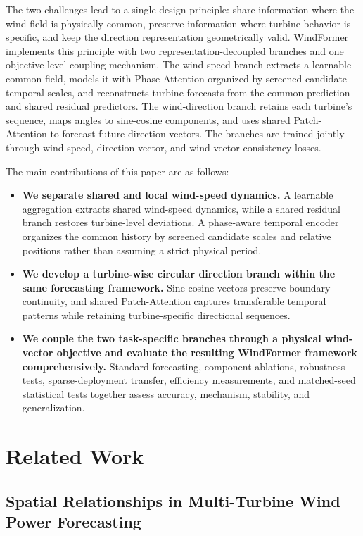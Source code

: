 The two challenges lead to a single design principle: share information where the wind field is physically common, preserve information where turbine behavior is specific, and keep the direction representation geometrically valid. WindFormer implements this principle with two representation-decoupled branches and one objective-level coupling mechanism. The wind-speed branch extracts a learnable common field, models it with Phase-Attention organized by screened candidate temporal scales, and reconstructs turbine forecasts from the common prediction and shared residual predictors. The wind-direction branch retains each turbine's sequence, maps angles to sine-cosine components, and uses shared Patch-Attention to forecast future direction vectors. The branches are trained jointly through wind-speed, direction-vector, and wind-vector consistency losses.

The main contributions of this paper are as follows:

\begin{itemize}
    \item \textbf{We separate shared and local wind-speed dynamics.} A learnable aggregation extracts shared wind-speed dynamics, while a shared residual branch restores turbine-level deviations. A phase-aware temporal encoder organizes the common history by screened candidate scales and relative positions rather than assuming a strict physical period.
    \item \textbf{We develop a turbine-wise circular direction branch within the same forecasting framework.} Sine-cosine vectors preserve boundary continuity, and shared Patch-Attention captures transferable temporal patterns while retaining turbine-specific directional sequences.
    \item \textbf{We couple the two task-specific branches through a physical wind-vector objective and evaluate the resulting WindFormer framework comprehensively.} Standard forecasting, component ablations, robustness tests, sparse-deployment transfer, efficiency measurements, and matched-seed statistical tests together assess accuracy, mechanism, stability, and generalization.
\end{itemize}

\section{Related Work}
\label{sec:related_work}

\subsection{Spatial Relationships in Multi-Turbine Wind Power Forecasting}


